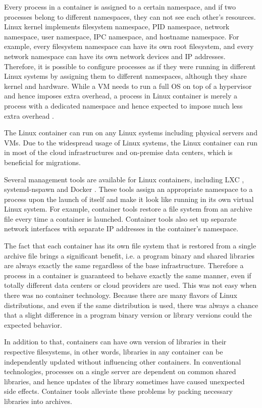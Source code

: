 Every process in a container is assigned to a certain namespace, and if two processes belong to different namespaces, they can not see each other's resources. 
Linux kernel implements filesystem namespace, PID namespace, network namespace, user namespace, IPC namespace, and hostname namespace. 
For example, every filesystem namespace can have its own root filesystem, and every network namespace can have its own network devices and IP addresses.
Therefore, it is possible to configure processes as if they were running in different Linux systems by assigning them to different namespaces, although they share kernel and hardware.
While a VM needs to run a full OS on top of a hypervisor and hence imposes extra overhead, a process in Linux container is merely a process with a dedicated namespace and hence expected to impose much less extra overhead \cite{felter2015updated}.

The Linux container can run on any Linux systems including physical servers and VMs.
Due to the widespread usage of Linux systems, the Linux container can run in most of the cloud infrastructures and on-premise data centers, which is beneficial for migrations.

Several management tools are available for Linux containers, including LXC \cite{noronha2018performance}, systemd-nspawn \cite{jedge2013} and Docker \cite{merkel2014docker}.
These tools assign an appropriate namespace to a process upon the launch of itself and make it look like running in its own virtual Linux system.
For example, container tools restore a file system from an archive file every time a container is launched. 
Container tools also set up separate network interfaces with separate IP addresses in the container's namespace.

The fact that each container has its own file system that is restored from a single archive file brings a significant benefit, i.e. a program binary and shared libraries are always exactly the same regardless of the base infrastructure.
Therefore a process in a container is guaranteed to behave exactly the same manner, even if totally different data centers or cloud providers are used.
This was not easy when there was no container technology.
Because there are many flavors of Linux distributions, and even if the same distribution is used, there was always a chance that a slight difference in a program binary version or library versions could  the expected behavior.

In addition to that, containers can have own version of libraries in their respective filesystems, in other words, libraries in any container can be independently updated without influencing other containers.
In conventional technologies, processes on a single server are dependent on common shared libraries, and hence updates of the library sometimes have caused unexpected side effects.
Container tools alleviate these problems by packing necessary libraries into archives. 


